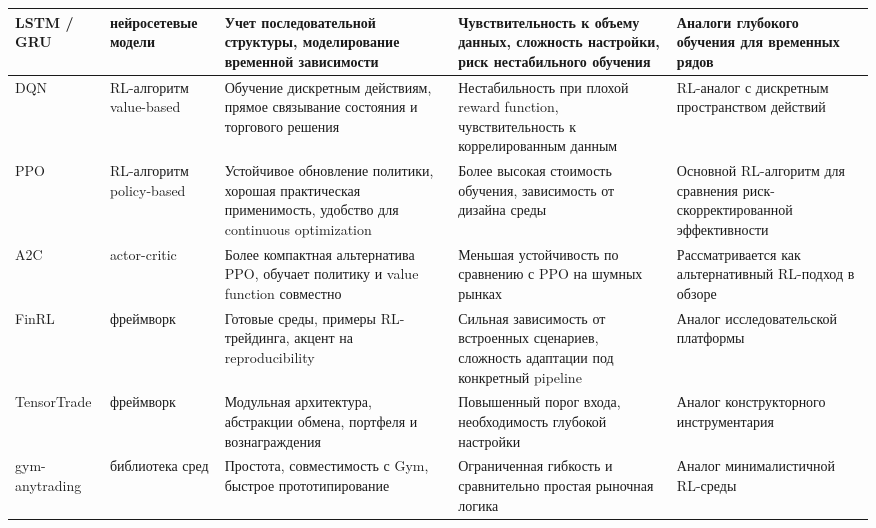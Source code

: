 \begin{center}
\begin{longtable}{|p{2.6cm}|p{2.3cm}|p{3.6cm}|p{3.8cm}|p{3.2cm}|}
\hline
LSTM / GRU & нейросетевые модели & Учет последовательной структуры, моделирование временной зависимости & Чувствительность к объему данных, сложность настройки, риск нестабильного обучения & Аналоги глубокого обучения для временных рядов \\
\hline
DQN & RL-алгоритм value-based & Обучение дискретным действиям, прямое связывание состояния и торгового решения & Нестабильность при плохой reward function, чувствительность к коррелированным данным & RL-аналог с дискретным пространством действий \\
\hline
PPO & RL-алгоритм policy-based & Устойчивое обновление политики, хорошая практическая применимость, удобство для continuous optimization & Более высокая стоимость обучения, зависимость от дизайна среды & Основной RL-алгоритм для сравнения риск-скорректированной эффективности \\
\hline
A2C & actor-critic & Более компактная альтернатива PPO, обучает политику и value function совместно & Меньшая устойчивость по сравнению с PPO на шумных рынках & Рассматривается как альтернативный RL-подход в обзоре \\
\hline
FinRL & фреймворк & Готовые среды, примеры RL-трейдинга, акцент на reproducibility & Сильная зависимость от встроенных сценариев, сложность адаптации под конкретный pipeline & Аналог исследовательской платформы \\
\hline
TensorTrade & фреймворк & Модульная архитектура, абстракции обмена, портфеля и вознаграждения & Повышенный порог входа, необходимость глубокой настройки & Аналог конструкторного инструментария \\
\hline
gym-anytrading & библиотека сред & Простота, совместимость с Gym, быстрое прототипирование & Ограниченная гибкость и сравнительно простая рыночная логика & Аналог минималистичной RL-среды \\
\hline
\end{longtable}
\end{center}
